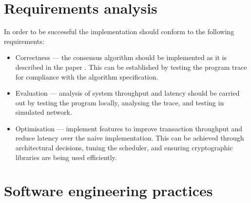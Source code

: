 \section{Requirements analysis} \label{requirements}

In order to be successful the implementation should conform to the following requirements:
\begin{itemize}
	\item Correctness --- the consensus algorithm should be implemented as it is described in the paper \cite{yin2019hotstuff}. This can be established by testing the program trace for compliance with the algorithm specification.
	\item Evaluation --- analysis of system throughput and latency should be carried out by testing the program locally, analysing the trace, and testing in simulated network.
	\item Optimisation --- implement features to improve transaction throughput and reduce latency over the naive implementation. This can be achieved through architectural decisions, tuning the scheduler, and ensuring cryptographic libraries are being used efficiently.
\end{itemize}



\section{Software engineering practices} \label{softwareeng}

